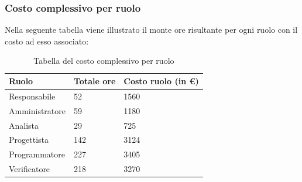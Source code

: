\subsubsection{Costo complessivo per ruolo}
Nella seguente tabella viene illustrato il monte ore risultante per ogni ruolo con il costo ad esso associato:
{
\renewcommand{\arraystretch}{2}
\begin{longtable}{ C{3cm} C{2cm} C{4cm}}
\caption{Tabella del costo complessivo per ruolo}\\
\rowcolor{\primaryColor}

\textcolor{\secondaryColor}{\textbf{Ruolo}} & 
\textcolor{\secondaryColor}{\textbf{Totale ore}} & 
\textcolor{\secondaryColor}{\textbf{Costo ruolo (in \euro{})}}\\	
\endhead
        
Responsabile   &  52 & 1560 \\
Amministratore &  59 & 1180 \\
Analista       &  29 & 725 \\
Progettista    &  142 & 3124 \\
Programmatore  &  227 & 3405 \\
Verificatore   &  218 & 3270 \\
        	
\end{longtable}
}


